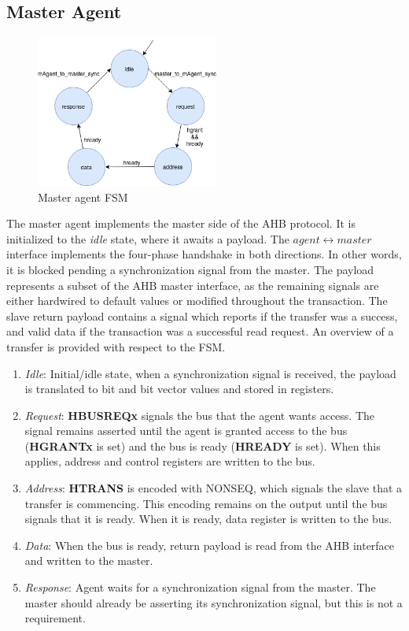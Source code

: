 \newpage
\subsection{Master Agent}
\label{sub:magt-rtl}
\begin{figure}
\includegraphics[width=6cm]{figs/hw/mAgent_FSM.png}
\caption{Master agent FSM}\label{fig:rafsm}
\end{figure}  

The master agent implements the master side of the AHB protocol. It is initialized to the \textit{idle} state, where it awaits a payload. The $agent\leftrightarrow master$ interface implements the four-phase handshake in both directions. In other words, it is blocked pending a synchronization signal from the master. The payload represents a subset of the AHB master interface, as the remaining signals are either hardwired to default values or modified throughout the transaction. The slave return payload contains a signal which reports if the transfer was a success, and valid data if the transaction was a successful read request. An overview of a transfer is provided with respect to the FSM.
\begin{enumerate}
 \item \textit{Idle}: Initial/idle state, when a synchronization signal is received, the payload is translated to bit and bit vector values and stored in registers.
 \item \textit{Request}: \textbf{HBUSREQx} signals the bus that the agent wants access. The signal remains asserted until the agent is granted access to the bus (\textbf{HGRANTx} is set) and the bus is ready (\textbf{HREADY} is set). When this applies, address and control registers are written to the bus. 
 \item \textit{Address}: \textbf{HTRANS} is encoded with NONSEQ, which signals the slave that a transfer is commencing. This encoding remains on the output until the bus signals that it is ready. When it is ready, data register is written to the bus. 
 \item \textit{Data}: When the bus is ready, return payload is read from the AHB interface and written to the master.
 \item \textit{Response}: Agent waits for a synchronization signal from the master. The master should already be asserting its synchronization signal, but this is not a requirement.   
\end{enumerate}

